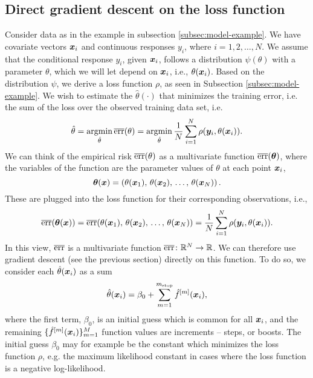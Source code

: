 \subsection{Direct gradient descent on the loss function}
Consider data as in the example in subsection \ref{subsec:model-example}.
We have covariate vectors $\bm{x}_i$ and continuous responses $y_i$, where $i=1,2,\ldots,N$.
We assume that the conditional response $y_i$, given $\bm{x}_i$, follows a distribution $\psi(\theta)$ with a parameter $\theta$, which we will let depend on $\bm{x}_i$, i.e., $\theta(\bm{x}_i)$.
Based on the distribution $\psi$, we derive a loss function $\rho$, as seen in Subsection \ref{subsec:model-example}.
We wish to estimate the $\hat{\theta}(\cdot)$ that minimizes the training error, i.e. the sum of the loss over the observed training data set, i.e.
\begin{equation*}
    \hat{\theta}=\operatorname*{argmin}_{\hat{\theta}}\overline{\text{err}}(\theta)=\operatorname*{argmin}_{\hat{\theta}}\frac{1}{N}\sum_{i=1}^{N} \rho(\bm{y}_i,\theta(\bm{x}_i)).
\end{equation*}
We can think of the empirical risk $\overline{\text{err}}(\theta)$ as a multivariate function $\overline{\text{err}}(\boldsymbol{\theta})$, where the variables of the function are the parameter values of $\theta$ at each point $\bm{x}_i$,
\begin{equation*}
    \boldsymbol{\theta}(\bm{x})=\left(\theta(\bm{x}_1),\,\theta(\bm{x}_2),\,\ldots,\,\theta(\bm{x}_N)\right).
\end{equation*}
These are plugged into the loss function for their corresponding observations, i.e.,
\begin{equation*}
    \overline{\text{err}}(\boldsymbol{\theta}(\bm{x}))=\overline{\text{err}}(\theta(\bm{x}_1),\,\theta(\bm{x}_2),\,\ldots,\,\theta(\bm{x}_N))=\frac{1}{N}\sum_{i=1}^{N} \rho(\bm{y}_i,\theta(\bm{x}_i)).
\end{equation*}
In this view, $\overline{\text{err}}$ is a multivariate function $\overline{\text{err}}\colon\mathbb{R}^N\to\mathbb{R}$.
We can therefore use gradient descent (see the previous section) directly on this function.
To do so, we consider each $\hat{\theta}(\bm{x}_i)$ as a sum
\begin{equation*}
    \hat{\theta}(\bm{x}_i)=\beta_0+\sum_{m=1}^{m_{\text{stop}}}\hat{f}^{[m]}(\bm{x}_i),
\end{equation*}
where the first term, $\beta_0$, is an initial guess which is common for all $\bm{x}_i$, and the remaining $\{\hat{f}^{[m]}(\bm{x}_i)\}_{m=1}^M$ function values are increments -- steps, or boosts.
The initial guess $\beta_0$ may for example be the constant which minimizes the loss function $\rho$, e.g. the maximum likelihood constant in cases where the loss function is a negative log-likelihood.
